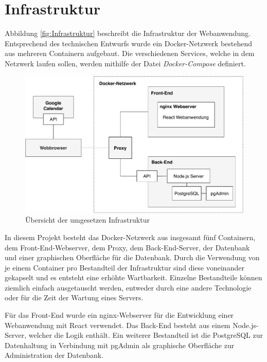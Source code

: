 \section{Infrastruktur}
Abbildung \vref{fig:Infrastruktur} beschreibt die Infrastruktur der Webanwendung. Entsprechend des technischen Entwurfs wurde ein Docker-Netzwerk bestehend aus mehreren Containern aufgebaut.
Die verschiedenen Services, welche in dem Netzwerk laufen sollen, werden mithilfe der Datei \textit{Docker-Compose} definiert.

\begin{figure}[h]
	\centering 
	\includegraphics[width=\textwidth]{img/ImplementierungInfrastruktur.pdf}
	\caption[Übersicht der umgesetzen Infrastruktur]{\label{fig:Infrastruktur}Übersicht der umgesetzen Infrastruktur}
\end{figure}

In diesem Projekt besteht das Docker-Netzwerk aus insgesamt fünf Containern, dem Front-End-Webserver, dem Proxy, dem Back-End-Server, der Datenbank und einer graphischen Oberfläche für die Datenbank.
Durch die Verwendung von je einem Container pro Bestandteil der Infrastruktur sind diese voneinander gekapselt und es entsteht eine erhöhte Wartbarkeit.
Einzelne Bestandteile können ziemlich einfach ausgetauscht werden, entweder durch eine andere Technologie oder für die Zeit der Wartung eines Servers.

Für das Front-End wurde ein nginx-Webserver für die Entwicklung einer Webanwendung mit React verwendet.
Das Back-End besteht aus einem Node.js-Server, welcher die Logik enthält.
Ein weiterer Bestandteil ist die PostgreSQL zur Datenhaltung in Verbindung mit pgAdmin als graphische Oberfläche zur Administration der Datenbank. 

